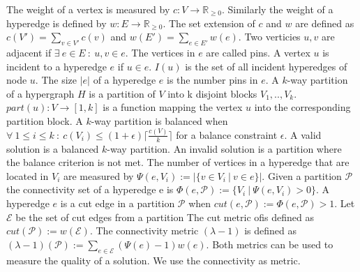 \documentclass[a4paper,12pt,titlepage, BCOR7mm,headsepline]{scrbook}
\numberwithin{equation}{section}
\begin{document}
The weight of a vertex is measured by $c: V \rightarrow  \mathbb R_{\ge 0}$. Similarly the weight of a hyperedge is defined by $w: E \rightarrow  \mathbb R_{\ge 0}$. 
The set extension of $c$ and $w$ are defined as $c(V') = \sum_{v \in V'} c(v)$ and $w(E') = \sum_{e \in E'} w(e)$. 
Two verticies $u, v$ are adjacent if $\exists\ e \in E\ :\ u, v \in e$. The vertices in $e$ are called pins. A vertex $u$ is incident to a hyperedge $e$ if $ u \in e$. $I(u)$ is the set of all incident hyperedges of node $u$. The size $|e|$ of a hyperedge $e$ is the number pins in $e$. A $k$-way partition of a hypergraph $H$ is a partition of $V$ into k disjoint blocks $V_1, .., V_k$. $part(u): V \rightarrow [1, k]$ is a function mapping the vertex $u$ into the corresponding partition block.
A $k$-way partition is balanced when $\forall\  1 \le i \le k\ :\ c(V_i) \le (1 + \epsilon) \lceil \frac{c(V)}{k} \rceil $ for a balance constraint $\epsilon$.
A valid solution is a balanced $k$-way partition. An invalid solution is a partition where the balance criterion is not met.
The number of vertices in a hyperedge that are located in $V_i$ are measured by $\Psi(e,V_i) := |\{v \in V_i \ |\ v \in e \}|$. Given a partition $\mathcal{P}$ the connectivity set of a hyperedge e is $\Phi(e, \mathcal{P}) :=  \{V_i\ |\ \Psi(e, V_i) > 0\}$. 
A hyperedge $e$ is a cut edge in a partition $\mathcal{P}$ when $cut(e, \mathcal{P}) := \Phi(e, \mathcal{P}) > 1$. 
Let $\mathcal{E}$ be the set of cut edges from a partition The cut metric ofis defined as $cut(\mathcal{P}) := w(\mathcal{E})$.
The connectivity metric $(\lambda - 1)$ is defined as $(\lambda - 1)(\mathcal{P}) := \sum_{e \in \mathcal{E}}(\Psi(e) - 1)w(e)$.
Both metrics can be used to measure the quality of a solution. We use the connectivity as metric. 
\end{document}
